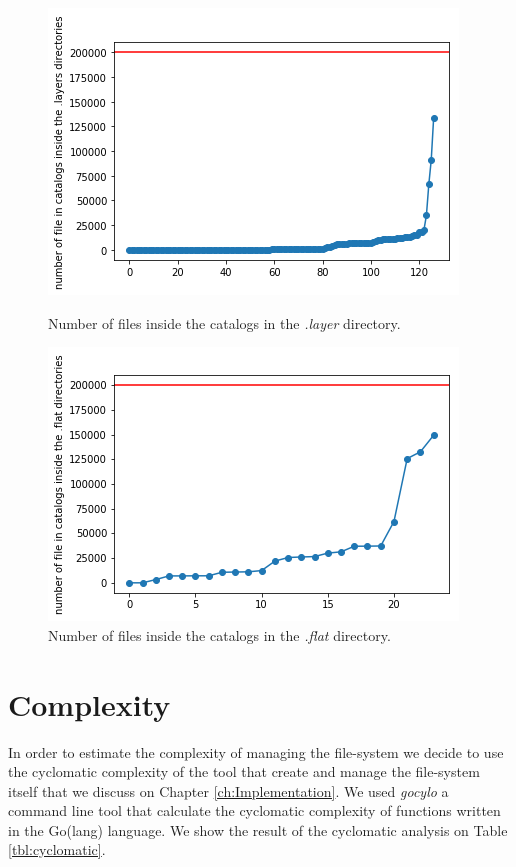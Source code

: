 \begin{figure}[]{}
    \includegraphics[width=\linewidth]{gfx/catalogs-layer}
        \caption{Number of files inside the catalogs in the \textit{.layer} directory.}
        \label{fig:layercatalog}
    
    \includegraphics[width=\textwidth]{gfx/catalogs-flat}
        \caption{Number of files inside the catalogs in the \textit{.flat} directory.}
        \label{fig:flatcatalog}
\end{figure}


\section{Complexity}

In order to estimate the complexity of managing the file-system we decide to
use the cyclomatic complexity of the tool that create and manage the
file-system itself that we discuss on Chapter \ref{ch:Implementation}. We used
\textit{gocylo} \cite{gocyclo} a command line tool that calculate the
cyclomatic complexity of functions written in the Go(lang) language. We show
the result of the cyclomatic analysis on Table \ref{tbl:cyclomatic}.

